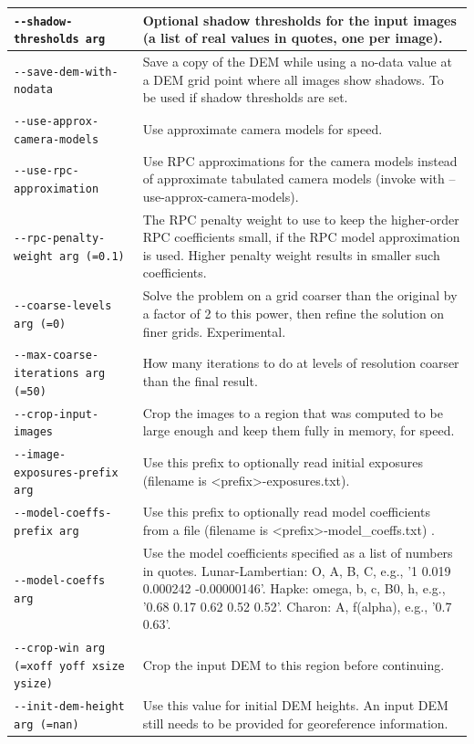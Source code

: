 \begin{longtable}{|l|p{7.5cm}|}
\texttt{-\/-shadow-thresholds arg} & Optional shadow thresholds for the input images (a list of real values in quotes, one per image).\\ \hline
\texttt{-\/-save-dem-with-nodata} & Save a copy of the DEM while using a no-data value at a DEM grid point where all images show shadows. To be used if shadow thresholds are set.\\ \hline
\texttt{-\/-use-approx-camera-models} & Use approximate camera models for speed.\\ \hline
\texttt{-\/-use-rpc-approximation} & Use RPC approximations for the camera models instead of approximate tabulated camera models (invoke with --use-approx-camera-models).\\ \hline
\texttt{-\/-rpc-penalty-weight arg (=0.1)} & The RPC penalty weight to use to keep the higher-order RPC coefficients small, if the RPC model approximation is used. Higher penalty weight results in smaller such coefficients.\\ \hline
\texttt{-\/-coarse-levels arg (=0)} & Solve the problem on a grid coarser than the original by a factor of 2 to this power, then refine the solution on finer grids. Experimental.\\ \hline
\texttt{-\/-max-coarse-iterations arg (=50)} & How many iterations to do at levels of resolution coarser than the final result.\\ \hline
\texttt{-\/-crop-input-images} & Crop the images to a region that was computed to be large enough and keep them fully in memory, for speed.\\ \hline
\texttt{-\/-image-exposures-prefix arg} & Use this prefix to optionally read initial exposures (filename is <prefix>-exposures.txt).\\ \hline
\texttt{-\/-model-coeffs-prefix arg} & Use this prefix to optionally read model coefficients from a file (filename is <prefix>-model\_coeffs.txt) .\\ \hline
\texttt{-\/-model-coeffs arg} & Use the model coefficients specified as a list of numbers in quotes. Lunar-Lambertian: O, A, B, C, e.g., '1 0.019 0.000242 -0.00000146'. Hapke: omega, b, c, B0, h, e.g., '0.68 0.17 0.62 0.52 0.52'. Charon: A, f(alpha), e.g., '0.7 0.63'.\\ \hline
\texttt{-\/-crop-win arg (=xoff yoff xsize ysize)} & Crop the input DEM to this region before continuing.\\ \hline
\texttt{-\/-init-dem-height arg (=nan)} & Use this value for initial DEM heights. An input DEM still needs to be provided for georeference information.\\ \hline

\end{longtable}
